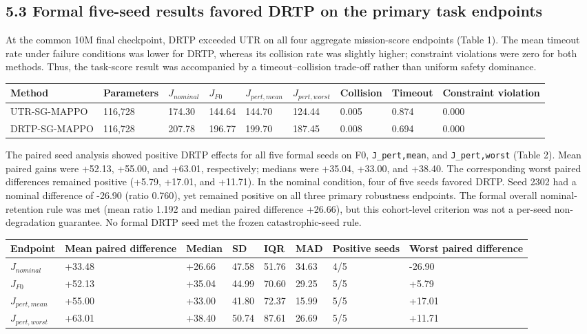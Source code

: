 \subsection{5.3 Formal five-seed results favored DRTP on the primary task endpoints}

At the common 10M final checkpoint, DRTP exceeded UTR on all four aggregate mission-score endpoints (Table 1). The mean timeout rate under failure conditions was lower for DRTP, whereas its collision rate was slightly higher; constraint violations were zero for both methods. Thus, the task-score result was accompanied by a timeout--collision trade-off rather than uniform safety dominance.

\begin{center}
\begin{tabular}{lllllllll}
\toprule
Method & Parameters & $J_{nominal}$ & $J_{F0}$ & $J_{pert,mean}$ & $J_{pert,worst}$ & Collision & Timeout & Constraint violation \\
\midrule
UTR-SG-MAPPO & 116,728 & 174.30 & 144.64 & 144.70 & 124.44 & 0.005 & 0.874 & 0.000 \\
DRTP-SG-MAPPO & 116,728 & 207.78 & 196.77 & 199.70 & 187.45 & 0.008 & 0.694 & 0.000 \\
\bottomrule
\end{tabular}
\end{center}

The paired seed analysis showed positive DRTP effects for all five formal seeds on F0, \texttt{J_pert,mean}, and \texttt{J_pert,worst} (Table 2). Mean paired gains were +52.13, +55.00, and +63.01, respectively; medians were +35.04, +33.00, and +38.40. The corresponding worst paired differences remained positive (+5.79, +17.01, and +11.71). In the nominal condition, four of five seeds favored DRTP. Seed 2302 had a nominal difference of -26.90 (ratio 0.760), yet remained positive on all three primary robustness endpoints. The formal overall nominal-retention rule was met (mean ratio 1.192 and median paired difference +26.66), but this cohort-level criterion was not a per-seed non-degradation guarantee. No formal DRTP seed met the frozen catastrophic-seed rule.

\begin{center}
\begin{tabular}{llllllll}
\toprule
Endpoint & Mean paired difference & Median & SD & IQR & MAD & Positive seeds & Worst paired difference \\
\midrule
$J_{nominal}$ & +33.48 & +26.66 & 47.58 & 51.76 & 34.63 & 4/5 & -26.90 \\
$J_{F0}$ & +52.13 & +35.04 & 44.99 & 70.60 & 29.25 & 5/5 & +5.79 \\
$J_{pert,mean}$ & +55.00 & +33.00 & 41.80 & 72.37 & 15.99 & 5/5 & +17.01 \\
$J_{pert,worst}$ & +63.01 & +38.40 & 50.74 & 87.61 & 26.69 & 5/5 & +11.71 \\
\bottomrule
\end{tabular}
\end{center}

